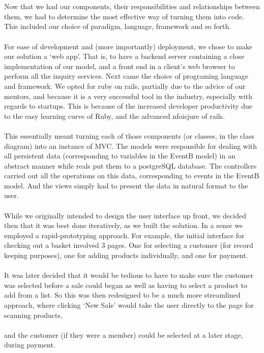 \documentclass[a4paper]{article}
\begin{document}
\\\\
Now that we had our components, their responsibilities and relationships between them, we had to determine the most effective way of turning them into code. This included our choice of paradigm, language, framework and so forth.
\\\\
For ease of development and (more importantly) deployment, we chose to make our solution a ‘web app’. That is,  to have a backend server containing a close implementation of our model, and a front end in a client’s web browser to perform all the inquiry services. Next came the choice of programing language and framework. We opted for ruby on rails, partially due to the advice of our mentors, and because it is a very successful tool in the industry, especially with regards to startups. This is because of the increased developer productivity due to the easy learning curve of Ruby, and the advanced nfoisjure of rails.
\\\\
This essentially meant turning each of those components (or classes, in the class diagram) into an instance of MVC. The models were responsible for dealing with all persistent data (corresponding to variables in the EventB model) in an abstract manner while reals put them to a postgreSQL database. The controllers carried out all the operations on this data, corresponding to events in the EventB model. And the views simply had to present the data in natural format to the user.
\\\\
While we originally intended to design the user interface up front, we decided then that it was best done iteratively, as we built the solution. In a sense we employed a rapid-prototyping approach. For example, the initial interface for checking out a basket involved 3 pages. One for selecting a customer (for record keeping purposes), one for adding products individually, and one for payment. 
\\\\



It was later decided that it would be tedious to have to make sure the customer was selected before a sale could began as well as having to select a product to add from a list. So this was then redesigned to be a much more streamlined approach, where clicking ‘New Sale’ would take the user directly to the page for scanning products,
\\\\
and the customer (if they were a member) could be selected at a later stage, during payment.
\end{document}

